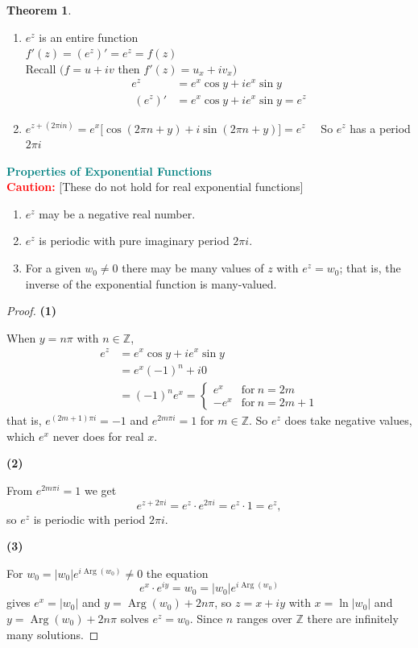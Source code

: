 \documentclass[11pt,a4paper]{article}
\theoremstyle{definition}
\newtheorem{thm}{Theorem}[section]
\newcommand{\subhead}[1]{%
  \par\medskip\noindent\textbf{#1}\par\nobreak\smallskip}
\begin{document}
\begin{thm}
\begin{enumerate}
\item $e^z$ is an entire function\\

$f'(z) = (e^z)' = e^z = f(z)$\\

Recall $(f = u + iv $ then $f'(z) = u_x + iv_x)$
\begin{align*}
e^z & = e^x \cos  y + i e^x\sin y\\\
(e^z)' &  = e^x \cos y + ie^x \sin y = e^z
\end{align*}

\item $e^{z + (2\pi i n)} = e^x\big[\cos (2\pi n + y ) + i \sin (2\pi n  + y) \big] = e^z\quad $
So $e^z$ has a period $2\pi i$\\
\end{enumerate}
\end{thm}



\textbf{\textcolor{teal}{Properties of Exponential Functions}}\\
\textbf{\textcolor{red}{Caution:}} [These do not hold for real exponential functions]

\begin{enumerate}
\item $e^z$ may be a negative real number.

\item $e^z$ is periodic with pure imaginary period $2\pi i$.

\item For a given $w_0\neq 0$ there may be many values of $z$ with $e^z = w_0$;
that is, the inverse of the exponential function is many-valued.
\end{enumerate}

\begin{proof}
\subhead{(1)}
When $y = n\pi$ with $n\in \mathbb{Z}$,
\begin{align*}
e^z &= e^x \cos y + ie^x\sin y\\
&= e^x(-1)^n + i0\\
&= (-1)^ne^x = \begin{cases}
e^x & \text{for}\ n  = 2m\\
-e^x & \text{for}\ n = 2m + 1
\end{cases}
\end{align*}
that is, $e^{(2m + 1)\pi i} = -1$ and $e^{2m\pi i} = 1$ for $m\in \mathbb{Z}$.
So $e^z$ does take negative values, which $e^x$ never does for real $x$.

\subhead{(2)}
From $e^{2m\pi i} = 1$ we get
$$e^{z + 2\pi i} = e^z\cdot e^{2\pi i} = e^z\cdot 1 = e^z ,$$
so $e^z$ is periodic with period $2\pi i$.

\subhead{(3)}
For $w_0 = \left|w_0\right|e^{i \operatorname{Arg}(w_0)} \neq 0$ the equation
$$e^x \cdot e^{iy} = w_0 = \left|w_0\right|e^{i\operatorname{Arg}(w_0)}$$
gives $e^x = \left|w_0\right|$ and $y = \operatorname{Arg}(w_0) + 2n\pi$, so
$z = x+iy$ with $x = \ln\left|w_0\right|$ and
$y = \operatorname{Arg}(w_0) + 2n\pi$ solves $e^z = w_0$. Since $n$ ranges over
$\mathbb{Z}$ there are infinitely many solutions.
\end{proof}
\end{document}

